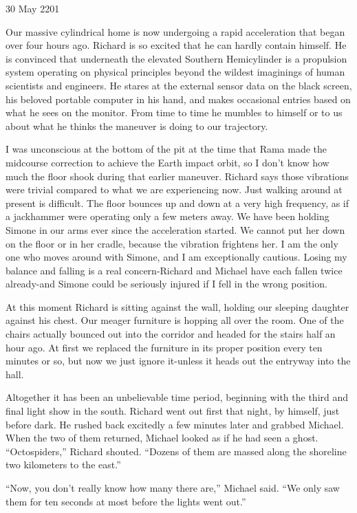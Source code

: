 \documentclass[]{article}
\begin{document}
30 May 2201

Our massive cylindrical home is now undergoing a rapid acceleration that began over four hours ago.  Richard is so excited that he can hardly contain himself.  He is convinced that underneath the elevated Southern Hemicylinder is a propulsion system operating on physical principles beyond the wildest imaginings of human scientists and engineers.  He stares at the external sensor data on the black screen, his beloved portable computer in his hand, and makes occasional entries based on what he sees on the monitor.  From time to time he mumbles to himself or to us about what he thinks the maneuver is doing to our trajectory.

I was unconscious at the bottom of the pit at the time that Rama made the midcourse correction to achieve the Earth impact orbit, so I don’t know how much the floor shook during that earlier maneuver.  Richard says those vibrations were trivial compared to what we are experiencing now.  Just walking around at present is difficult.  The floor bounces up and down at a very high frequency, as if a jackhammer were operating only a few meters away.  We have been holding Simone in our arms ever since the acceleration started.  We cannot put her down on the floor or in her cradle, because the vibration frightens her.  I am the only one who moves around with Simone, and I am exceptionally cautious.  Losing my balance and falling is a real concern-Richard and Michael have each fallen twice already-and Simone could be seriously injured if I fell in the wrong position.

At this moment Richard is sitting against the wall, holding our sleeping daughter against his chest.  Our meager furniture is hopping all over the room.  One of the chairs actually bounced out into the corridor and headed for the stairs half an hour ago.  At first we replaced the furniture in its proper position every ten minutes or so, but now we just ignore it-unless it heads out the entryway into the hall.

Altogether it has been an unbelievable time period, beginning with the third and final light show in the south.  Richard went out first that night, by himself, just before dark.  He rushed back excitedly a few minutes later and grabbed Michael.  When the two of them returned, Michael looked as if he had seen a ghost.  “Octospiders,” Richard shouted.  “Dozens of them are massed along the shoreline two kilometers to the east.”

“Now, you don’t really know how many there are,” Michael said.  “We only saw them for ten seconds at most before the lights went out.”
\end{document}
